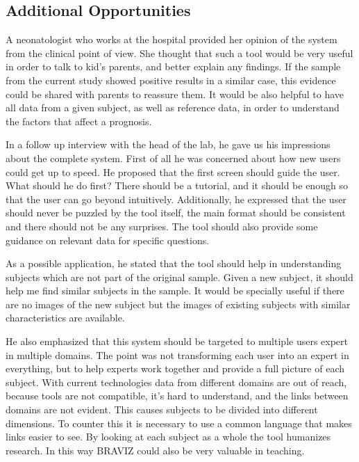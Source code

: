 % 


\subsection{Additional Opportunities}

A neonatologist who works at the hospital provided her opinion of the system from the clinical point of view. She thought that such a tool would be very useful in order to talk to kid's parents, and better explain any findings. If the sample from the current study showed positive results in a similar case, this evidence could be shared with parents to reassure them. It would be also helpful to have all data from a given subject, as well as reference data, in order to understand the factors that affect a prognosis. 


In a follow up interview with the head of the lab, he gave us his impressions about the complete system. First of all he was concerned about how new users could get up to speed. He proposed that the first screen should guide the user. What should he do first? There should be a tutorial, and it should be enough so that the user can go beyond intuitively. Additionally, he expressed that the user should never be puzzled by the tool itself, the main format should be consistent and there should not be any surprises. The tool should also provide some guidance on relevant data for specific questions. 

As a possible application, he stated that the tool should help in understanding subjects which are not part of the original sample. Given a new subject, it should help me find similar subjects in the sample. It would be specially useful if there are no images of the new subject but the images of existing subjects with similar characteristics are available. 

He also emphasized that this system should be targeted to multiple users expert in multiple domains. The point was not transforming each user into an expert in everything, but to help experts work together and provide a full picture of each subject. With current technologies data from different domains are out of reach, because tools are not compatible, it's hard to understand, and the links between domains are not evident. This causes subjects to be divided into different dimensions. To counter this it is necessary to use a common language that makes links easier to see. By looking at each subject as a whole the tool humanizes research. In this way BRAVIZ could also be very valuable in teaching. 

